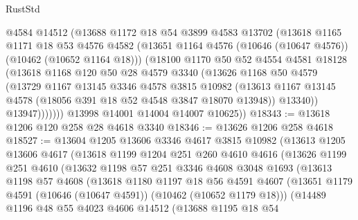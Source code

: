 \begin{lexlean}{RustStd}
\begin{coremodule}
              @4584
              @14512
              (@13688
                @1172
                @18
                @54
                @3899
                @4583
                @13702
                (@13618
                  @1165
                  @1171
                  @18
                  @53
                  @4576
                  @4582
                  (@13651 @1164 @4576 (@10646 (@10647 @4576)) (@10462 (@10652 @1164 @18)))
                  (@18100
                    @1170
                    @50
                    @52
                    @4554
                    @4581
                    @18128
                    (@13618
                      @1168
                      @120
                      @50
                      @28
                      @4579
                      @3340
                      (@13626
                        @1168
                        @50
                        @4579
                        (@13729
                          @1167
                          @13145
                          @3346
                          @4578
                          @3815
                          @10982
                          (@13613
                            @1167
                            @13145
                            @4578
                            (@18056 @391 @18 @52 @4548 @3847 @18070 @13948))
                          @13340))
                      @13947)))))))
        @13998
        @14001
        @14004
        @14007
        @10625))
@18343 := @13618 @1206 @120 @258 @28 @4618 @3340
@18346 := @13626 @1206 @258 @4618
@18527 := @13604
    @1205
    @13606
    @3346
    @4617
    @3815
    @10982
    (@13613
      @1205
      @13606
      @4617
      (@13618
        @1199
        @1204
        @251
        @260
        @4610
        @4616
        (@13626
          @1199
          @251
          @4610
          (@13632
            @1198
            @57
            @251
            @3346
            @4608
            @3048
            @1693
            (@13613
              @1198
              @57
              @4608
              (@13618
                @1180
                @1197
                @18
                @56
                @4591
                @4607
                (@13651 @1179 @4591 (@10646 (@10647 @4591)) (@10462 (@10652 @1179 @18)))
                (@14489
                  @1196
                  @48
                  @55
                  @4023
                  @4606
                  @14512
                  (@13688
                    @1195
                    @18
                    @54

\end{coremodule}
\end{lexlean}
